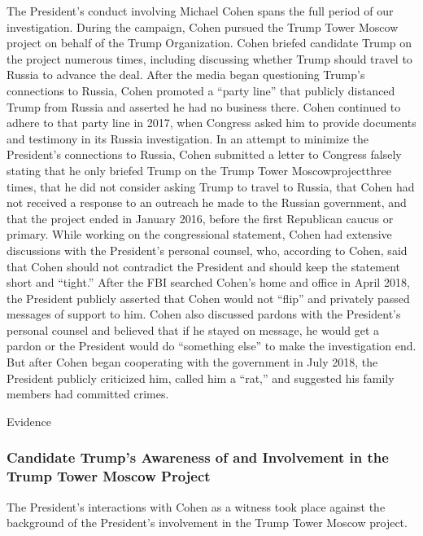 The President's conduct involving Michael Cohen spans the full period of our investigation.
During the campaign, Cohen pursued the Trump Tower Moscow project on behalf of the Trump Organization.
Cohen briefed candidate Trump on the project numerous times, including discussing whether Trump should travel to Russia to advance the deal.
After the media began questioning Trump's connections to Russia, Cohen promoted a “party line” that publicly distanced Trump from Russia and asserted he had no business there.
Cohen continued to adhere to that party line in 2017, when Congress asked him to provide documents and testimony in its Russia investigation.
In an attempt to minimize the President's connections to Russia, Cohen submitted a letter to Congress falsely stating that he only briefed Trump on the Trump Tower Moscowprojectthree times, that he did not consider asking Trump to travel to Russia, that Cohen had not received a response to an outreach he made to the Russian government, and that the project ended in January 2016, before the first Republican caucus or primary.
While working on the congressional statement, Cohen had extensive discussions with the President's personal counsel, who, according to Cohen, said that Cohen should not contradict the President and should keep the statement short and “tight.”
After the FBI searched Cohen's home and office in April 2018, the President publicly asserted that Cohen would not “flip” and privately passed messages of support to him.
Cohen also discussed pardons with the President's personal counsel and believed that if he stayed on message, he would get a pardon or the President would do “something else” to make the investigation end.
But after Cohen began cooperating with the government in July 2018, the President publicly criticized him, called him a “rat,” and suggested his family members had committed crimes.

Evidence

\subsubsection{Candidate Trump's Awareness of and Involvement in the Trump Tower Moscow Project}

The President's interactions with Cohen as a witness took place against the background of the President's involvement in the Trump Tower Moscow project.

